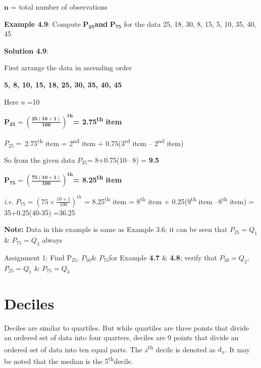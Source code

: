\documentclass[
]{book}
\makeatletter
\newenvironment{kframe}{%
\medskip{}
\setlength{\fboxsep}{.8em}
 \def\at@end@of@kframe{}%
 \ifinner\ifhmode%
  \def\at@end@of@kframe{\end{minipage}}%
  \begin{minipage}{\columnwidth}%
 \fi\fi%
 \def\FrameCommand##1{\hskip\@totalleftmargin \hskip-\fboxsep
 \colorbox{shadecolor}{##1}\hskip-\fboxsep
     \hskip-\linewidth \hskip-\@totalleftmargin \hskip\columnwidth}%
 \MakeFramed {\advance\hsize-\width
   \@totalleftmargin\z@ \linewidth\hsize
   \@setminipage}}%
 {\par\unskip\endMakeFramed%
 \at@end@of@kframe}
\newenvironment{rmdblock}[1]
  {
  \begin{itemize}
  \renewcommand{\labelitemi}{
    \raisebox{-.7\height}[0pt][0pt]{
      {\setkeys{Gin}{width=3em,keepaspectratio}\texttt{[image: images/\#1]}}
    }
  }
  \setlength{\fboxsep}{1em}
  \begin{kframe}
  \item
  }
  {
  \end{kframe}
  \end{itemize}
  }
\newenvironment{rmdnote}
  {\begin{rmdblock}{note}}
  {\end{rmdblock}}
\makeatother
\begin{document}
\(\mathbf{n}\) = total number of observations

\textbf{Example 4.9}: Compute \(\mathbf{P}_{\mathbf{25}}\)\textbf{and}
\(\mathbf{P}_{\mathbf{75}}\) for the data 25, 18, 30, 8, 15, 5, 10, 35,
40, 45

\textbf{Solution 4.9}:

First arrange the data in ascending order

\textbf{5, 8, 10, 15, 18, 25, 30, 35, 40, 45}

Here \emph{n} =10

\(\mathbf{P}_{\mathbf{25}}\mathbf{=}\left( \frac{\mathbf{25}\left( \mathbf{10 + 1} \right)}{\mathbf{100}} \right)^{\mathbf{\text{th}}}\)\textbf{=
2.75\textsuperscript{th} item}

\(P_{25} = \ \)2.75\textsuperscript{th} item = 2\textsuperscript{nd} item + 0.75(3\textsuperscript{rd}
item -- 2\textsuperscript{nd} item)

So from the given data \(P_{25}\)= 8+0.75(10-- 8) = \textbf{9.5}

\(\mathbf{P}_{\mathbf{75}}\mathbf{=}\left( \frac{\mathbf{75}\left( \mathbf{10 + 1} \right)}{\mathbf{100}} \right)^{\mathbf{\text{th}}}\)\textbf{=
8.25\textsuperscript{th} item}

\emph{i}.\emph{e}. \(P_{75} = \left( 75 \times \frac{10 + 1}{100} \right)^{th}\) =
8.25\textsuperscript{th} item = 8\textsuperscript{th} item + 0.25(9\textsuperscript{th} item --8\textsuperscript{th} item) =
35+0.25(40-35) =36.25

\textbf{Note:} Data in this example is same as Example 3.6; it can be seen
that \(P_{25} = Q_{1}\) \& \(P_{75} = Q_{3}\) always

\begin{rmdnote}
Assignment 1: Find \(\text{P}_{25}\), \(P_{50}\)\& \(P_{75}\)for Example
\textbf{4.7} \& \textbf{4.8}; verify that \(P_{50} = Q_{2}\), \(P_{25} = Q_{1}\) \&
\(P_{75} = Q_{3}\)
\end{rmdnote}

\hypertarget{deciles}{%
\section{Deciles}\label{deciles}}

Deciles are similar to quartiles. But while quartiles are three points
that divide an ordered set of data into four quarters, deciles are 9
points that divide an ordered set of data into ten equal parts. The
\emph{x}\textsuperscript{th} decile is denoted as\(\text{\ d}_{x}\). It may be noted that the
median is the 5\textsuperscript{th}decile.
\end{document}
